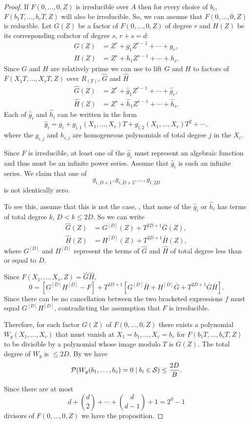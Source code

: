 \begin{proof}
If $F(0, \ldots, 0, Z)$ is irreducible over $A$ then for every choice
of $b_i$, $F(b_1 T, \ldots, b_v T, Z)$ will also be irreducible.  So,
we can assume that $F(0, \ldots, 0, Z)$ is reducible.  Let $G(Z)$ be a
factor of $F(0, \ldots, 0, Z)$ of degree $r$ and $H(Z)$ be its
corresponding cofactor of degree $s$, $r+s=d$:
\[
\begin{aligned}
G(Z) & = Z^r + g_1 Z^{r-1} + \cdots + g_r, \\
H(Z) & = Z^s + h_1 Z^{s-1} + \cdots + h_s. 
\end{aligned}
\]
Since $G$ and $H$ are relatively prime we can use
 to lift $G$ and $H$ to factors of $F(X_1
T, \ldots, X_v T, Z)$ over $R_{(T)}$, $\hat{G}$ and $\hat{H}$
\[
\begin{aligned}
\hat{G}(Z) & = Z^r + \hat{g}_1 Z^{r-1} + \cdots + \hat{g}_r, \\
\hat{H}(Z) & = Z^s + \hat{h}_1 Z^{s-1} + \cdots + \hat{h}_s. 
\end{aligned}
\]
Each of $\hat{g}_i$ and $\hat{h}_i$ can be written in the form
\[
\hat{g}_i = g_i + g_{i,1}(X_1, \ldots, X_v)T + g_{i,2}(X_1, \ldots, X_v) T^2
 + \cdots,
\]
where the $g_{i,j}$ and $h_{i,j}$ are homogeneous polynomials of total
degree $j$ in the $X_i$.

Since $F$ is irreducible, at least one of the $\hat{g}_i$ must
represent an algebraic function and thus must be an infinite power
series.  Assume that $\hat{g}_i$ is such an infinite series.  We
claim that one of
\[
g_{i,D+1}, g_{i,D+2}, \ldots, g_{i,2D}
\]
is not identically zero.  

To see this, assume that this is not the case, \ie, that none of the
$\hat{g}_i$ or $\hat{h}_i$ has terms of total degree $k$, $D < k \le
2D$.  So we can write
\[
\begin{aligned}
\hat{G}(Z) & = G^{[D]}(Z) + T^{2D+1} \bar{G}(Z), \\
\hat{H}(Z) & = H^{[D]}(Z) + T^{2D+1} \bar{H}(Z),
\end{aligned}
\]
where $G^{[D]}$ and $H^{[D]}$ represent the terms of $\hat{G}$ and
$\hat{H}$ of total degree less than or equal to $D$.

Since $F(X_1, \ldots, X_v, Z) = \hat{G} \hat{H}$,
\[
0 = \left[ G^{[D]} H^{[D]} - F \right]
+ T^{2D+1} \left[ G^{[D]} \bar{H} +
H^{[D]} \bar{G} + T^{2D+1} \bar{G}\bar{H}\right].
\]
Since there can be no cancellation between the two bracketed
expressions $f$ must equal $G^{[D]}H^{[D]}$, contradicting the
assumption that $F$ is irreducible. 

Therefore, for each factor $G(Z)$ of $F(0, \ldots, 0, Z)$ there exists
a polynomial $W_g(X_1, \ldots, X_v)$ that must vanish at $X_1  = b_1, \ldots,
X_v = b_v$ for $F(b_1 T, \ldots, b_v T, Z)$ to be divisible by a polynomial
whose image modulo $T$ is $G(Z)$.  The total degree of $W_g$
is $\le 2D$.  By  we have
\[
{\cal P}(W_g(b_1, \ldots, b_v) = 0 \mid b_i \in {\cal S}) \le
\frac{2D}{B}.
\]

Since there are at most 
\[
d + \binom{d}{2} + \cdots + \binom{d}{d-1} + 1 =2^d -1
\]
divisors of $F(0,\ldots, 0, Z)$ we have the proposition.
\end{proof}

